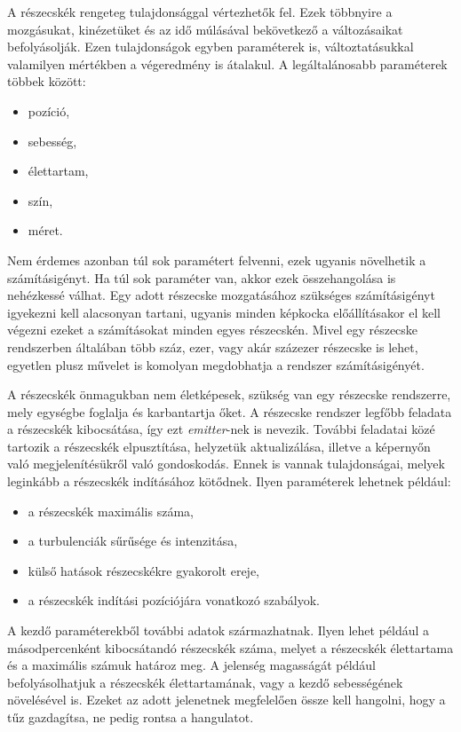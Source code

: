 A részecskék rengeteg tulajdonsággal vértezhetők fel. Ezek többnyire a mozgásukat, kinézetüket és az idő múlásával bekövetkező a változásaikat befolyásolják. Ezen tulajdonságok egyben paraméterek is, változtatásukkal valamilyen mértékben a végeredmény is átalakul. A legáltalánosabb paraméterek többek között:
\begin{itemize}
\item pozíció, 
\item sebesség, 
\item élettartam, 
\item szín, 
\item méret. 
\end{itemize}
Nem érdemes azonban túl sok paramétert felvenni, ezek ugyanis növelhetik a számításigényt. Ha túl sok paraméter van, akkor ezek összehangolása is nehézkessé válhat. Egy adott részecske mozgatásához szükséges számításigényt igyekezni kell alacsonyan tartani, ugyanis minden képkocka előállításakor el kell végezni ezeket a számításokat minden egyes részecskén. Mivel egy részecske rendszerben általában több száz, ezer, vagy akár százezer részecske is lehet, egyetlen plusz művelet is komolyan megdobhatja a rendszer számításigényét.

A részecskék önmagukban nem életképesek, szükség van egy részecske rendszerre, mely egységbe foglalja és karbantartja őket. A részecske rendszer legfőbb feladata a részecskék kibocsátása, így ezt \textit{emitter}-nek is nevezik. További feladatai közé tartozik a részecskék elpusztítása, helyzetük aktualizálása, illetve a képernyőn való megjelenítésükről való gondoskodás. Ennek is vannak tulajdonságai, melyek leginkább a részecskék indításához kötődnek. Ilyen paraméterek lehetnek például:
\begin{itemize}
\item a részecskék maximális száma, 
\item a turbulenciák sűrűsége és intenzitása, 
\item külső hatások részecskékre gyakorolt ereje, 
\item a részecskék indítási pozíciójára vonatkozó szabályok.
\end{itemize}

A kezdő paraméterekből további adatok származhatnak. Ilyen lehet például a másodpercenként kibocsátandó részecskék száma, melyet a részecskék élettartama és a maximális számuk határoz meg. A jelenség magasságát például befolyásolhatjuk a részecskék élettartamának, vagy a kezdő sebességének növelésével is. Ezeket az adott jelenetnek megfelelően össze kell hangolni, hogy a tűz gazdagítsa, ne pedig rontsa a hangulatot.


